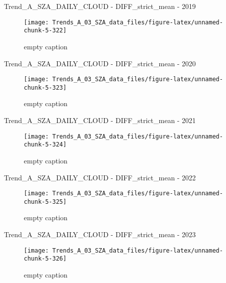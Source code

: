 \documentclass[
  10pt,
  a4paper,oneside]{article}
\begin{document}
Trend\_A\_SZA\_DAILY\_CLOUD - DIFF\_strict\_mean - 2019

\begin{figure}[!ht]

{\centering \texttt{[image: Trends\_A\_03\_SZA\_data\_files/figure-latex/unnamed-chunk-5-322]} 

}

\caption{ empty caption }\label{fig:unnamed-chunk-5-322}
\end{figure}

Trend\_A\_SZA\_DAILY\_CLOUD - DIFF\_strict\_mean - 2020

\begin{figure}[!ht]

{\centering \texttt{[image: Trends\_A\_03\_SZA\_data\_files/figure-latex/unnamed-chunk-5-323]} 

}

\caption{ empty caption }\label{fig:unnamed-chunk-5-323}
\end{figure}

Trend\_A\_SZA\_DAILY\_CLOUD - DIFF\_strict\_mean - 2021

\begin{figure}[!ht]

{\centering \texttt{[image: Trends\_A\_03\_SZA\_data\_files/figure-latex/unnamed-chunk-5-324]} 

}

\caption{ empty caption }\label{fig:unnamed-chunk-5-324}
\end{figure}

Trend\_A\_SZA\_DAILY\_CLOUD - DIFF\_strict\_mean - 2022

\begin{figure}[!ht]

{\centering \texttt{[image: Trends\_A\_03\_SZA\_data\_files/figure-latex/unnamed-chunk-5-325]} 

}

\caption{ empty caption }\label{fig:unnamed-chunk-5-325}
\end{figure}

Trend\_A\_SZA\_DAILY\_CLOUD - DIFF\_strict\_mean - 2023

\begin{figure}[!ht]

{\centering \texttt{[image: Trends\_A\_03\_SZA\_data\_files/figure-latex/unnamed-chunk-5-326]} 

}

\caption{ empty caption }\label{fig:unnamed-chunk-5-326}
\end{figure}
\end{document}
